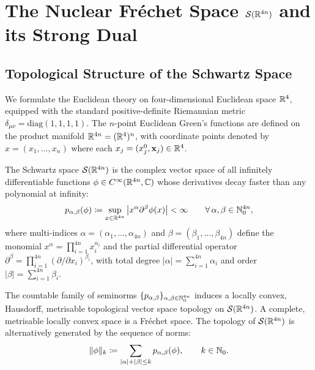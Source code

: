 \section{The Nuclear Fr\'echet Space \texorpdfstring{$\mathcal{S}(\mathbb{R}^{4n})$}{S(R^{4n})} and its Strong Dual}
\label{sec:nuclear_frechet}

\subsection{Topological Structure of the Schwartz Space}
\label{subsec:schwartz_topology}

We formulate the Euclidean theory on four-dimensional Euclidean space $\mathbb{R}^4$, equipped with the standard positive-definite Riemannian metric $\delta_{\mu\nu} = \mathrm{diag}(1, 1, 1, 1)$. The $n$-point Euclidean Green's functions are defined on the product manifold $\mathbb{R}^{4n} = (\mathbb{R}^4)^n$, with coordinate points denoted by $x = (x_1, \dots, x_n)$ where each $x_j = (x_j^0, \mathbf{x}_j) \in \mathbb{R}^4$.

\begin{definition}
\label{def:schwartz_space}
The Schwartz space $\mathcal{S}(\mathbb{R}^{4n})$ is the complex vector space of all infinitely differentiable functions $\phi \in C^\infty(\mathbb{R}^{4n}, \mathbb{C})$ whose derivatives decay faster than any polynomial at infinity:
\begin{equation}
\label{eq:schwartz_seminorm}
p_{\alpha, \beta}(\phi) \coloneqq \sup_{x \in \mathbb{R}^{4n}} \left| x^\alpha \partial^\beta \phi(x) \right| < \infty \qquad \forall \, \alpha, \beta \in \mathbb{N}_0^{4n},
\end{equation}
where multi-indices $\alpha = (\alpha_1, \dots, \alpha_{4n})$ and $\beta = (\beta_1, \dots, \beta_{4n})$ define the monomial $x^\alpha = \prod_{i=1}^{4n} x_i^{\alpha_i}$ and the partial differential operator $\partial^\beta = \prod_{i=1}^{4n} (\partial / \partial x_i)^{\beta_i}$, with total degree $|\alpha| = \sum_{i=1}^{4n} \alpha_i$ and order $|\beta| = \sum_{i=1}^{4n} \beta_i$.
\end{definition}

The countable family of seminorms $\{p_{\alpha, \beta}\}_{\alpha, \beta \in \mathbb{N}_0^{4n}}$ induces a locally convex, Hausdorff, metrisable topological vector space topology on $\mathcal{S}(\mathbb{R}^{4n})$. A complete, metrisable locally convex space is a Fr\'echet space. The topology of $\mathcal{S}(\mathbb{R}^{4n})$ is alternatively generated by the sequence of norms:
\begin{equation}
\label{eq:frechet_norms_k}
\|\phi\|_k \coloneqq \sum_{|\alpha| + |\beta| \le k} p_{\alpha, \beta}(\phi), \qquad k \in \mathbb{N}_0.
\end{equation}

